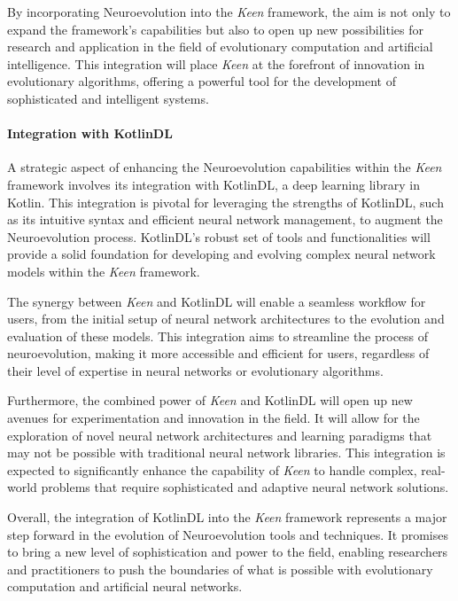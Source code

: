         By incorporating Neuroevolution into the \textit{Keen} framework, the aim is not only to expand the framework's 
        capabilities but also to open up new possibilities for research and application in the field of evolutionary 
        computation and artificial intelligence. This integration will place \textit{Keen} at the forefront of 
        innovation in evolutionary algorithms, offering a powerful tool for the development of sophisticated and 
        intelligent systems.

        \paragraph{Integration with KotlinDL}
            A strategic aspect of enhancing the Neuroevolution capabilities within the \textit{Keen} framework involves 
            its integration with KotlinDL, a deep learning library in Kotlin. This integration is pivotal for leveraging 
            the strengths of KotlinDL, such as its intuitive syntax and efficient neural network management, to augment 
            the Neuroevolution process. KotlinDL's robust set of tools and functionalities will provide a solid 
            foundation for developing and evolving complex neural network models within the \textit{Keen} framework.

            The synergy between \textit{Keen} and KotlinDL will enable a seamless workflow for users, from the initial 
            setup of neural network architectures to the evolution and evaluation of these models. This integration aims 
            to streamline the process of neuroevolution, making it more accessible and efficient for users, regardless 
            of their level of expertise in neural networks or evolutionary algorithms.

            Furthermore, the combined power of \textit{Keen} and KotlinDL will open up new avenues for experimentation 
            and innovation in the field. It will allow for the exploration of novel neural network architectures and 
            learning paradigms that may not be possible with traditional neural network libraries. This integration is 
            expected to significantly enhance the capability of \textit{Keen} to handle complex, real-world problems 
            that require sophisticated and adaptive neural network solutions.

            Overall, the integration of KotlinDL into the \textit{Keen} framework represents a major step forward in the 
            evolution of Neuroevolution tools and techniques. It promises to bring a new level of sophistication and 
            power to the field, enabling researchers and practitioners to push the boundaries of what is possible with 
            evolutionary computation and artificial neural networks.

